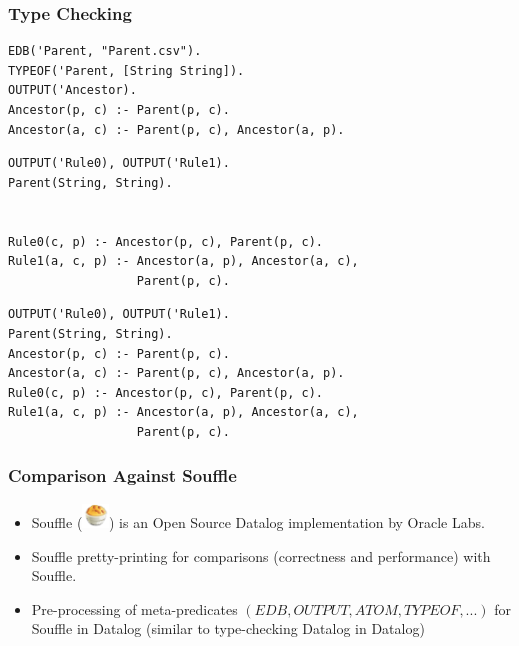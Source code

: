 \documentclass{beamer}
\begin{document}
\begin{frame}[fragile]{}
\frametitle{Type Checking}
\vspace*{-0.2cm}
\centering{}
\begin{verbatim}
EDB('Parent, "Parent.csv").
TYPEOF('Parent, [String String]).
OUTPUT('Ancestor).
Ancestor(p, c) :- Parent(p, c).
Ancestor(a, c) :- Parent(p, c), Ancestor(a, p).
\end{verbatim}
\vspace*{-0.7cm}
\begin{center}
\end{center}
\vspace*{-0.5cm}
\begin{overprint}
\begin{verbatim}
OUTPUT('Rule0), OUTPUT('Rule1).
Parent(String, String).


Rule0(c, p) :- Ancestor(p, c), Parent(p, c).
Rule1(a, c, p) :- Ancestor(a, p), Ancestor(a, c), 
                  Parent(p, c).
\end{verbatim}
\begin{verbatim}
OUTPUT('Rule0), OUTPUT('Rule1).
Parent(String, String).
Ancestor(p, c) :- Parent(p, c).
Ancestor(a, c) :- Parent(p, c), Ancestor(a, p).
Rule0(c, p) :- Ancestor(p, c), Parent(p, c).
Rule1(a, c, p) :- Ancestor(a, p), Ancestor(a, c), 
                  Parent(p, c).
\end{verbatim}
\end{overprint}
\end{frame}

\begin{frame}
\frametitle{Comparison Against Souffle}
\begin{itemize}
\item<1-> Souffle (\includegraphics[width=20pt]{souffle.png}) is an Open Source Datalog implementation by Oracle Labs.
\item<2-> Souffle pretty-printing for comparisons (correctness and performance) with Souffle.
\item<3-> Pre-processing of meta-predicates $(EDB, OUTPUT, ATOM, TYPEOF, ...)$ for Souffle in Datalog (similar to type-checking Datalog in Datalog)
\end{itemize}
\end{frame}
\end{document}
